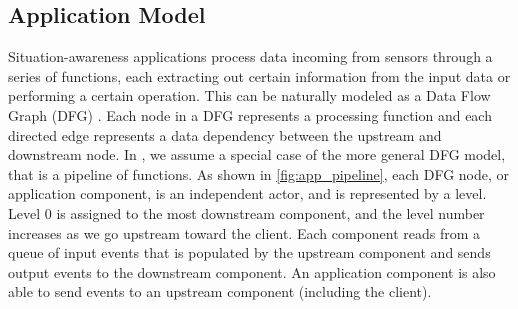 \subsection{Application Model}
\label{sec:oneedge_app_model}
Situation-awareness applications process data incoming from sensors through a series of functions, each extracting out certain information from the input data or performing a certain operation. This can be naturally modeled as a Data Flow Graph (DFG) \cite{dfg}. Each node in a DFG represents a processing function and each directed edge represents a data dependency between the upstream and downstream node. In \oneedge{}, we assume a special case of the more general DFG model, that is a pipeline of functions. As shown in \cref{fig:app_pipeline}, each DFG node, or application component, is an independent actor, and is represented by a level. Level 0 is assigned to the most downstream component, and the level number increases as we go upstream toward the client. Each component reads from a queue of input events that is populated by the upstream component and sends output events to the downstream component. An application component is also able to send events to an upstream component (including the client).

